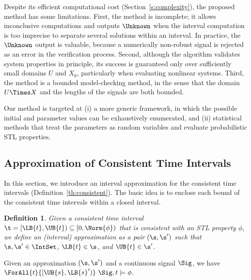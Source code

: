 \documentclass[paper]{ieice}
\newtheorem{definition}{Definition}
\begin{document}
Despite its efficient computational cost (Section~\ref{s:complexity}), the proposed method has some limitations.
First, the method is incomplete; it allows inconclusive computations and outputs $\Unknown$ when the interval computation is too imprecise to separate several solutions within an interval.
In practice, the $\Unknown$ output is valuable, because a numerically non-robust signal is rejected as an error in the verification process.
Second, although the algorithm validates system properties in principle, its success is guaranteed only over sufficiently small domains $U$ and $X_0$, particularly when evaluating nonlinear systems.
Third, the method is a bounded model-checking method, in the sense that the domain $U\Times X$ and the lengths of the signals are both bounded.

Our method is targeted at (i) a more generic framework, in which the possible initial and parameter values can be exhaustively enumerated, and (ii) statistical methods that treat the parameters as random variables and evaluate probabilistic STL properties.


\subsection{Approximation of Consistent Time Intervals}
\label{s:method:approx}

In this section, we introduce an interval approximation for the consistent time intervals (Definition~\ref{th:consistent}).
The basic idea is to enclose each bound of the consistent time intervals within a closed interval.
\begin{definition} \label{d:acti}
	Given a consistent time interval $\t = [\LB{t},\UB{t}) \subseteq [0,\Norm{\phi})$ that is consistent with an STL property $\phi$, we define an \emph{(interval) approximation} as a pair $(\s,\s')$ such that $\s,\s' \in\IntSet$, $\LB{t} \in \s$, and $\UB{t} \in \s'$.
\end{definition}
Given an approximation $(\s, \s')$ and a continuous signal $\Sig$, we have $\ForAll{t}{[\UB{s},\LB{s}')}~\Sig,t\models\phi$.
\end{document}
